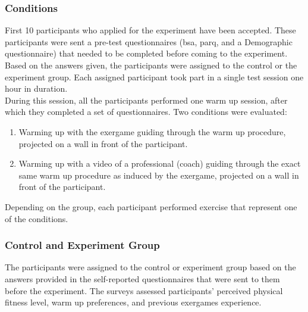 \subsubsection{Conditions}
First 10 participants who applied for the experiment have been accepted. These participants were sent a pre-test questionnaires (\acrshort{bsa}, \acrshort{parq}, and a Demographic questionnaire) that needed to be completed before coming to the experiment. Based on the answers given, the participants were assigned to the control or the experiment group. Each assigned participant took part in a single test session one hour in duration. \\During this session, all the participants  performed one warm up session, after which they completed a set of questionnaires. Two conditions were evaluated:
\begin{enumerate}
\item Warming up with the exergame guiding through the warm up procedure, projected on a wall in front of the participant.
\item Warming up with a video of a professional (coach) guiding through the exact same warm up procedure as induced by the exergame, projected on a wall in front of the participant.
\end{enumerate}
Depending on the group, each participant performed exercise that represent one of the conditions.
\subsubsection{Control and Experiment Group}
The participants were assigned to the control or experiment group based on the answers provided in the self-reported questionnaires that were sent to them before the experiment. The surveys assessed participants' perceived physical fitness level, warm up preferences, and previous exergames experience.
